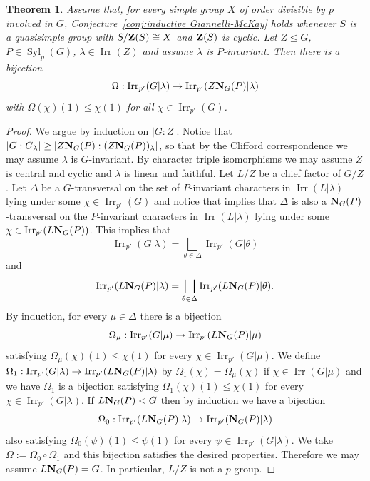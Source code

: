 \documentclass[12pt]{amsart}
\theoremstyle{plain}
\newtheorem{thm}{Theorem}[section]
\theoremstyle{definition}
\numberwithin{equation}{section}
\newcommand{\normal}{\trianglelefteq}
\newcommand{\Syl}{\operatorname{Syl}}
\newcommand{\Irr}{\operatorname{Irr}}
\def\zent#1{{\bf Z}(#1)}
\def\norm#1#2{{\bf N}_{#1}(#2)}
\begin{document}
\begin{thm}\label{thm:GMC reduction}
Assume that, for every simple group $X$ of order divisible by $p$
involved in $G$, Conjecture~\ref{conj:inductive Giannelli-McKay}
holds whenever $S$ is a quasisimple group with $S/\zent S\cong X$
and $\zent S$ is cyclic. Let $Z\normal G$, $P\in\Syl_p(G)$, $\lambda\in\Irr(Z)$ and
assume $\lambda$ is $P$-invariant. Then there is a bijection
$$\Omega:\Irr_{p'}(G|\lambda)\rightarrow\Irr_{p'}(Z\norm G P|\lambda)$$
with $\Omega(\chi)(1)\leq\chi(1)$ for all $\chi\in\Irr_{p'}(G)$.
\end{thm}

\begin{proof}
We argue by induction on $|G:Z|$. Notice that
$|G:G_\lambda|\geq|Z\norm G P:(Z\norm G P)_\lambda|$, so that by the
Clifford correspondence we may assume $\lambda$ is $G$-invariant. By
character triple isomorphisms we may assume $Z$ is central and
cyclic and $\lambda$ is linear and faithful. Let $L/Z$ be a chief
factor of $G/Z$. Let $\Delta$ be a $G$-transversal on the set of
$P$-invariant characters in $\Irr(L|\lambda)$ lying under some $\chi\in\Irr_{p'}(G)$ and notice that
\cite[Lemma~9.3]{N} implies that $\Delta$ is also a $\norm G
P$-transversal on the $P$-invariant characters in $\Irr(L|\lambda)$ lying under some $\chi\in\Irr_{p'}(L\norm G P)$.
This implies that
$$\Irr_{p'}(G|\lambda)=\bigsqcup_{\theta\in\Delta}\Irr_{p'}(G|\theta)$$ and
$$\Irr_{p'}(L\norm G P|\lambda)=\bigsqcup_{\theta\in\Delta}\Irr_{p'}(L\norm G P|\theta).$$
By induction, for every $\mu\in\Delta$ there is a bijection
$$\Omega_\mu:\Irr_{p'}(G|\mu)\rightarrow\Irr_{p'}(L\norm G P|\mu)$$
satisfying $\Omega_\mu(\chi)(1)\leq\chi(1)$ for every
$\chi\in\Irr_{p'}(G|\mu)$. We define
$\Omega_1:\Irr_{p'}(G|\lambda)\rightarrow\Irr_{p'}(L\norm G
P|\lambda)$ by $\Omega_1(\chi)=\Omega_\mu(\chi)$ if
$\chi\in\Irr(G|\mu)$ and we have $\Omega_1$ is a bijection
satisfying $\Omega_1(\chi)(1)\leq\chi(1)$ for every
$\chi\in\Irr_{p'}(G|\lambda)$. If $L\norm G P<G$ then by induction
we have a bijection $$\Omega_0:\Irr_{p'}(L\norm G
P|\lambda)\rightarrow\Irr_{p'}(\norm G P|\lambda)$$ also satisfying
$\Omega_0(\psi)(1)\leq\psi(1)$ for every
$\psi\in\Irr_{p'}(G|\lambda)$. We take
$\Omega:=\Omega_0\circ\Omega_1$ and this bijection satisfies the
desired properties. Therefore we may assume $L\norm G P=G$. In
particular, $L/Z$ is not a $p$-group.


\end{proof}
\end{document}
